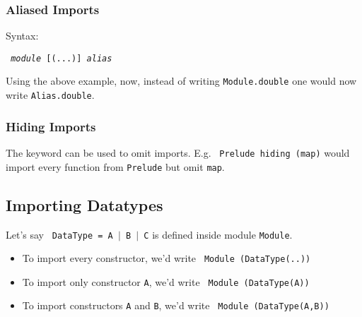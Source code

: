 \subsubsection{Aliased Imports}

Syntax:

\begin{center}
  \texttt{ \textit{module} [(...)]  \textit{alias}}
\end{center}

Using the above example, now, instead of writing \texttt{Module.double} one would now write \texttt{Alias.double}.

\subsubsection{Hiding Imports}
The \texttt{} keyword can be used to omit imports.
E.g. \texttt{ Prelude \texttt{hiding} (map)} would import every function from \texttt{Prelude} but omit \texttt{map}.

\subsection{Importing Datatypes}
Let's say \texttt{ DataType = A $\mid$ B $\mid$ C} is defined inside module \texttt{Module}.

\begin{itemize}
  \item To import every constructor, we'd write \texttt{ Module (DataType(..))}
  \item To import only constructor \texttt{A}, we'd write \texttt{ Module (DataType(A))}
  \item To import constructors \texttt{A} and \texttt{B}, we'd write \texttt{ Module (DataType(A,B))}
\end{itemize}